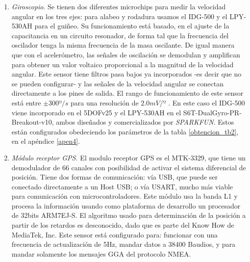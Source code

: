 \documentclass[10pt]{report}
\numberwithin{equation}{chapter}
\numberwithin{algorithm}{chapter}
\begin{document}
\begin{enumerate}
\item \emph{Giroscopio}. Se tienen dos diferentes microchips para medir la velocidad angular en los tres ejes: para alabeo y rodadura usamos el IDG-500 y el LPY-530AH para el guiñeo. Su funcionamiento está basado, en el ajuste de la capacitancia en un circuito resonador, de forma tal que la frecuencia del oscilador tenga la misma frecuencia de la masa oscilante. De igual manera que con el acelerómetro, las señales de oscilación se demodulan y amplifican para obtener un valor voltaico proporcional a la magnitud de la velocidad angular. Este sensor tiene filtros pasa bajos ya incorporados -es decir que no se pueden configurar- y las señales de la velocidad angular se conectan directamente a los pines de salida. El rango de funcionamiento de este sensor está entre $\pm 300º/s$ para una resolución de $2.0mV/º$ . En este caso el IDG-500 viene incorporado en el 5DOFv25 y el LPY-530AH en el S6T-DualGyro-PR-Breakout-v10, ambos diseñados y comercializados por \emph{SPARKFUN}. Estos están configurados obedeciendo los parámetros de la tabla \ref{obtencion_tb2}, en el apéndice \ref{apen4}.
\item \emph{Módulo receptor GPS.}
El modulo receptor GPS es el MTK-3329, que tiene un demodulador de 66 canales con posibilidad de activar el sistema diferencial de posición. Tiene dos formas de comunicación: vía USB, que puede ser conectado directamente a un Host USB; o vía USART, mucho más viable para comunicación con microcontroladores. Este módulo usa la banda L1 y procesa la información usando como plataforma de desarrollo un procesador de 32bits ARM7EJ-S. El algoritmo usado para determinación de la posición a partir de los retardos es desconocido, dado que es parte del Know How de MediaTek, Inc. Este sensor está configurado para: funcionar con una frecuencia de actualización de 5Hz, mandar datos a 38400 Baudios, y para mandar solamente los mensajes GGA del protocolo NMEA.
\end{enumerate}
\end{document}

